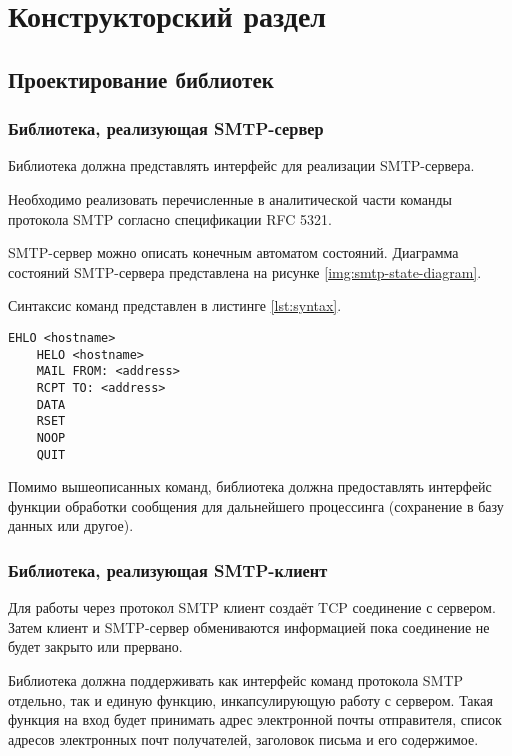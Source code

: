 \chapter{Конструкторский раздел}

\section{Проектирование библиотек}

\subsection{Библиотека, реализующая SMTP-сервер}

Библиотека должна представлять интерфейс для реализации SMTP-сервера.

Необходимо реализовать перечисленные в аналитической части команды протокола SMTP согласно спецификации RFC 5321.

SMTP-сервер можно описать конечным автоматом состояний.
Диаграмма состояний SMTP-сервера представлена на рисунке \ref{img:smtp-state-diagram}.


Синтаксис команд представлен в листинге \ref{lst:syntax}.

\begin{lstlisting}[gobble=8, caption={Синтаксис поддерживаемых комманд\label{lst:syntax}}]
	EHLO <hostname>
	HELO <hostname>
	MAIL FROM: <address>
	RCPT TO: <address>
	DATA
	RSET
	NOOP
	QUIT
\end{lstlisting}

Помимо вышеописанных команд, библиотека должна предоставлять интерфейс функции обработки сообщения для дальнейшего процессинга (сохранение в базу данных или другое).

\subsection{Библиотека, реализующая SMTP-клиент}

Для работы через протокол SMTP клиент создаёт TCP соединение с сервером.
Затем клиент и SMTP-сервер обмениваются информацией пока соединение не будет закрыто или прервано.

Библиотека должна поддерживать как интерфейс команд протокола SMTP отдельно, так и единую функцию, инкапсулирующую работу с сервером.
Такая функция на вход будет принимать адрес электронной почты отправителя, список адресов электронных почт получателей, заголовок письма и его содержимое.

